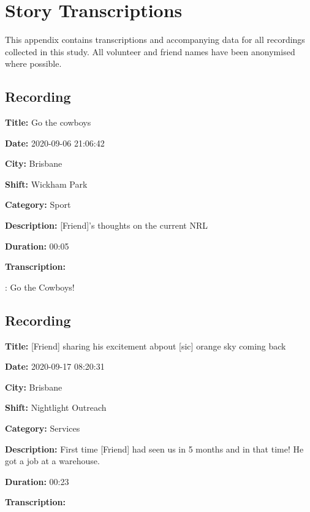 {
\setlength{\parindent}{0em}

\chapter{Story Transcriptions}
\label{appendix:transcriptions}

This appendix contains transcriptions and accompanying data for all recordings collected in this study. All volunteer and friend names have been anonymised where possible.

\tocless\section{Recording }

\textbf{Title:} Go the cowboys

\textbf{Date:} 2020-09-06 21:06:42

\textbf{City:} Brisbane

\textbf{Shift:} Wickham Park

\textbf{Category:} Sport

\textbf{Description:} [Friend]'s thoughts on the current NRL

\textbf{Duration:} 00:05

\textbf{Transcription:}

\begin{drama}

    \friendspeaks: Go the Cowboys!
\end{drama}

\tocless\section{Recording }

\textbf{Title:} [Friend] sharing his excitement abpout [sic] orange sky coming back

\textbf{Date:} 2020-09-17 08:20:31

\textbf{City:} Brisbane

\textbf{Shift:} Nightlight Outreach

\textbf{Category:} Services

\textbf{Description:} First time [Friend] had seen us in 5 months and in that time! He got a job at a warehouse.

\textbf{Duration:} 00:23

\textbf{Transcription:}

\begin{drama}


\end{drama}}
